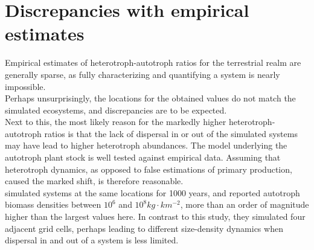 \section{Discrepancies with empirical estimates}
Empirical estimates of heterotroph-autotroph ratios for the terrestrial realm are generally sparse, as fully characterizing and quantifying a system is nearly impossible.\\ 
Perhaps unsurprisingly, the locations for the obtained values do not match the simulated ecosystems, and discrepancies are to be expected. \\
Next to this, the most likely reason for the markedly higher heterotroph-autotroph ratios is that the lack of dispersal in or out of the simulated systems may have lead to higher heterotroph abundances. The model \citep{Smith2012} underlying the autotroph plant stock is well tested against empirical data. Assuming that heterotroph dynamics, as opposed to false estimations of primary production, caused the marked shift, is therefore reasonable.\\ \cite{Harfoot2014} simulated systems at the same locations for 1000 years, and reported autotroph biomass densities between $10^{6}$ and $10^{8} kg\cdot km^{-2}$, more than an order of magnitude higher than the largest values here. 
In contrast to this study, they simulated four adjacent grid cells, perhaps leading to different size-density dynamics when dispersal in and out of a system is less limited.
